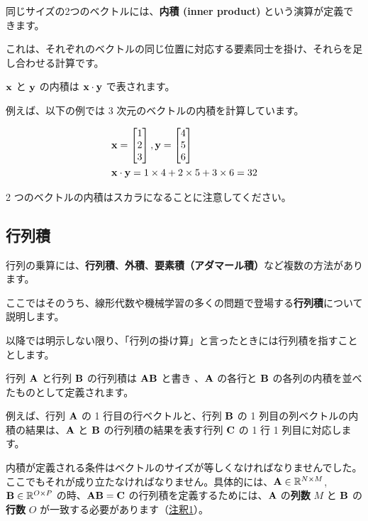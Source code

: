 同じサイズの2つのベクトルには、\textbf{内積 (inner product)} という演算が定義できます。

これは、それぞれのベクトルの同じ位置に対応する要素同士を掛け、それらを足し合わせる計算です。

${\bf x}$ と ${\bf y}$ の内積は ${\bf x}\cdot {\bf y}$ で表されます。

例えば、以下の例では 3 次元のベクトルの内積を計算しています。


\[
\begin{aligned}&
{\bf x} =
\begin{bmatrix}
1 \\ 2 \\ 3
\end{bmatrix},
{\bf y} =
\begin{bmatrix}
4 \\
5 \\
6
\end{bmatrix}\\
& {\bf x} \cdot {\bf y} = 1 \times 4 + 2 \times 5  + 3 \times 6 = 32 \end{aligned}
\]


2 つのベクトルの内積はスカラになることに注意してください。


\subsection{行列積}


行列の乗算には、\textbf{行列積}、\textbf{外積}、\textbf{要素積（アダマール積）}など複数の方法があります。

ここではそのうち、線形代数や機械学習の多くの問題で登場する\textbf{行列積}について説明します。

以降では明示しない限り、「行列の掛け算」と言ったときには行列積を指すこととします。


行列 ${\bf A}$ と行列 ${\bf B}$ の行列積は ${\bf AB}$ と書き 、${\bf A}$ の各行と ${\bf B}$ の各列の内積を並べたものとして定義されます。

例えば、行列 ${\bf A}$ の 1 行目の行ベクトルと、行列 ${\bf B}$ の 1 列目の列ベクトルの内積の結果は、${\bf A}$ と ${\bf B}$ の行列積の結果を表す行列 ${\bf C}$ の 1 行 1 列目に対応します。




内積が定義される条件はベクトルのサイズが等しくなければなりませんでした。ここでもそれが成り立たなければなりません。具体的には、${\bf A} \in \mathbb{R}^{N \times M}$, ${\bf B} \in \mathbb{R}^{O \times  P}$ の時、${\bf A} {\bf B}={\bf C}$ の行列積を定義するためには、${\bf  A}$ の\textbf{列数} $M$ と ${\bf B}$ の\textbf{行数}  $O$ が一致する必要があります（\hyperref[06a-basics-of-linear-algebra-note1]{注釈1}）。

